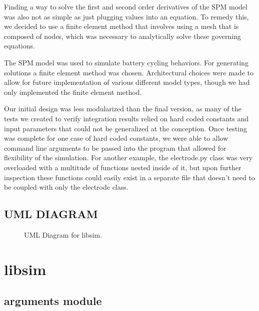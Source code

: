 \documentclass[letterpaper,10pt,english]{sphinxmanual}
\begin{document}
\sphinxAtStartPar
Finding a way to solve the first and second order derivatives of the
SPM model was also not as simple as just plugging values into an
equation. To remedy this, we decided to use a finite element method
that involves using a mesh that is composed of nodes, which was
necessary to analytically solve these governing equations.

\sphinxAtStartPar
The SPM model was used to simulate battery cycling behaviors. For
generating solutions a finite element method was chosen. Architectural
choices were made to allow for future implementation of various different
model types, though we had only implemented the finite element method.

\sphinxAtStartPar
Our initial design was less modularized than the final version, as many of
the tests we created to verify integration results relied on hard coded
constants and input parameters that could not be generalized at the conception.
Once testing was complete for one case of hard coded constants, we were able to
allow command line arguments to be passed into the program that allowed for
flexibility of the simulation. For another example, the electrode.py class was
very overloaded with a multitude of functions nested inside of it, but upon
further inspection these functions could easily exist in a separate file that
doesn’t need to be coupled with only the electrode class.


\section{UML DIAGRAM}
\label{\detokenize{design_process:uml-diagram}}
\begin{figure}[htbp]
\centering
\capstart

\noindent{}
\caption{UML Diagram for libsim.}\label{\detokenize{design_process:id1}}\end{figure}


\chapter{libsim}
\label{\detokenize{modules:libsim}}\label{\detokenize{modules::doc}}

\section{arguments module}
\label{\detokenize{arguments:arguments-module}}\label{\detokenize{arguments::doc}}
\end{document}
